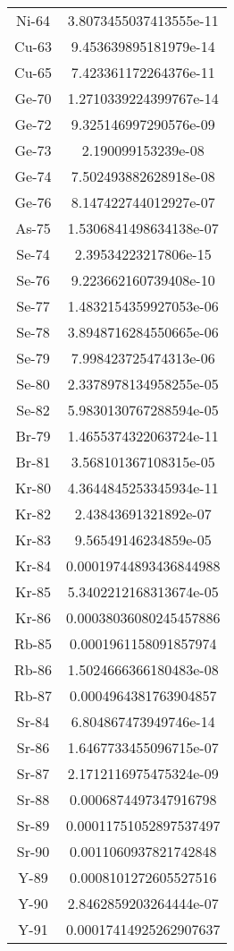 \begin{table}[h!]
\begin{tabular}{|| c || c |}
Ni-64 & 3.8073455037413555e-11 \\
Cu-63 & 9.453639895181979e-14 \\
Cu-65 & 7.423361172264376e-11 \\
Ge-70 & 1.2710339224399767e-14 \\
Ge-72 & 9.325146997290576e-09 \\
Ge-73 & 2.190099153239e-08 \\
Ge-74 & 7.502493882628918e-08 \\
Ge-76 & 8.147422744012927e-07 \\
As-75 & 1.5306841498634138e-07 \\
Se-74 & 2.39534223217806e-15 \\
Se-76 & 9.223662160739408e-10 \\
Se-77 & 1.4832154359927053e-06 \\
Se-78 & 3.8948716284550665e-06 \\
Se-79 & 7.998423725474313e-06 \\
Se-80 & 2.3378978134958255e-05 \\
Se-82 & 5.9830130767288594e-05 \\
Br-79 & 1.4655374322063724e-11 \\
Br-81 & 3.568101367108315e-05 \\
Kr-80 & 4.3644845253345934e-11 \\
Kr-82 & 2.43843691321892e-07 \\
Kr-83 & 9.56549146234859e-05 \\
Kr-84 & 0.00019744893436844988 \\
Kr-85 & 5.3402212168313674e-05 \\
Kr-86 & 0.00038036080245457886 \\
Rb-85 & 0.0001961158091857974 \\
Rb-86 & 1.5024666366180483e-08 \\
Rb-87 & 0.0004964381763904857 \\
Sr-84 & 6.804867473949746e-14 \\
Sr-86 & 1.6467733455096715e-07 \\
Sr-87 & 2.1712116975475324e-09 \\
Sr-88 & 0.0006874497347916798 \\
Sr-89 & 0.00011751052897537497 \\
Sr-90 & 0.0011060937821742848 \\
Y-89 & 0.0008101272605527516 \\
Y-90 & 2.8462859203264444e-07 \\
Y-91 & 0.00017414925262907637 \\

\end{tabular}
\end{table}
